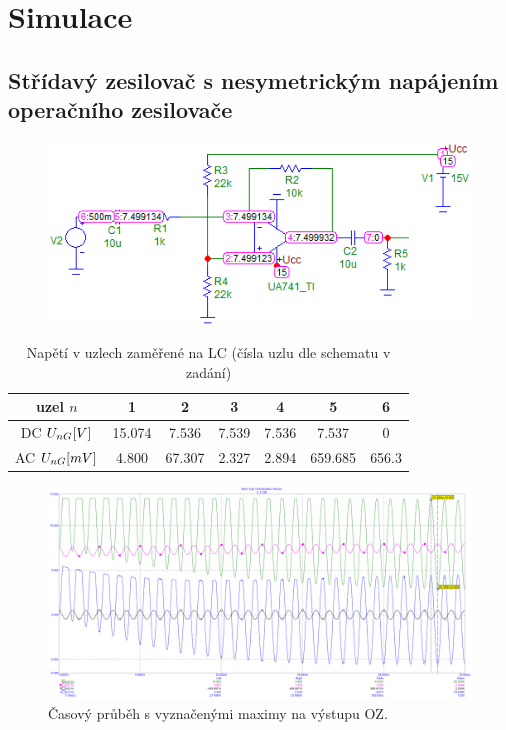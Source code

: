 \documentclass{article}
\begin{document}
\section*{Simulace}
\subsection*{Střídavý zesilovač s nesymetrickým napájením operačního zesilovače}
\begin{figure}[H]
  \begin{minipage}[t]{\textwidth}
    \includegraphics[width=\textwidth]{PC/ukol1/DC.png}
  \end{minipage}
\end{figure}

\begin{table}[H]
  \centering
  \begin{tabular}{|c|c|c|c|c|c|c|} 
    \hline
    uzel \(n\)          & 1       & 2      & 3     & 4     & 5       & 6      \\ \hline
    DC \(U_{nG}\-[V]\)  & 15.074  & 7.536  & 7.539 & 7.536 & 7.537   & 0      \\ \hline
    AC \(U_{nG}\-[mV]\) & 4.800   & 67.307 & 2.327 & 2.894 & 659.685 & 656.3  \\ \hline
  \end{tabular}
  \normalsize
  \caption{\label{tab_pracovni_bod_rozladeni1} Napětí v uzlech zaměřené na LC (čísla uzlu dle schematu v zadání)}
\end{table}

\begin{figure}[H]
  \begin{minipage}[t]{\textwidth}
    \centering
    \includegraphics[width=\textwidth]{PC/ukol1/transient.png}
    Časový průběh s vyznačenými maximy na výstupu OZ.
  \end{minipage}
\end{figure}
\end{document}
